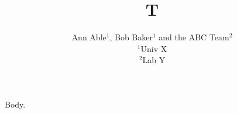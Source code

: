 \documentclass{article}
\begin{document}
\title{T}
\author{Ann Able$^{1}$, Bob Baker$^{1}$ and the ABC Team$^{2}$ \\ $^{1}$Univ X \\ $^{2}$Lab Y}
\maketitle
Body.
\end{document}
